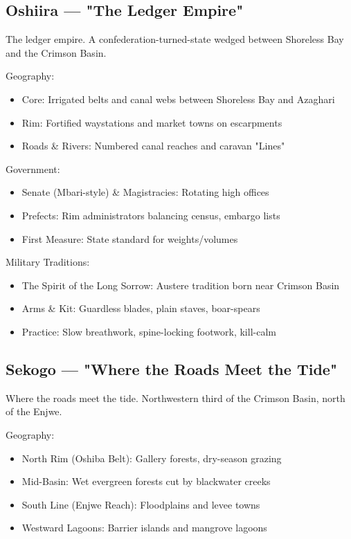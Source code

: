 \subsection{Oshiira — "The Ledger Empire"}
\label{sec:oshiira}

The ledger empire. A confederation-turned-state wedged between Shoreless Bay and the Crimson Basin.

Geography:
\begin{itemize}
    \item Core: Irrigated belts and canal webs between Shoreless Bay and Azaghari
    \item Rim: Fortified waystations and market towns on escarpments
    \item Roads \& Rivers: Numbered canal reaches and caravan "Lines"
\end{itemize}

Government:
\begin{itemize}
    \item Senate (Mbari-style) \& Magistracies: Rotating high offices
    \item Prefects: Rim administrators balancing census, embargo lists
    \item First Measure: State standard for weights/volumes
\end{itemize}

Military Traditions:
\begin{itemize}
    \item The Spirit of the Long Sorrow: Austere tradition born near Crimson Basin
    \item Arms \& Kit: Guardless blades, plain staves, boar-spears
    \item Practice: Slow breathwork, spine-locking footwork, kill-calm
\end{itemize}

\subsection{Sekogo — "Where the Roads Meet the Tide"}
\label{sec:sekogo}

Where the roads meet the tide. Northwestern third of the Crimson Basin, north of the Enjwe.

Geography:
\begin{itemize}
    \item North Rim (Oshiba Belt): Gallery forests, dry-season grazing
    \item Mid-Basin: Wet evergreen forests cut by blackwater creeks
    \item South Line (Enjwe Reach): Floodplains and levee towns
    \item Westward Lagoons: Barrier islands and mangrove lagoons
\end{itemize}

